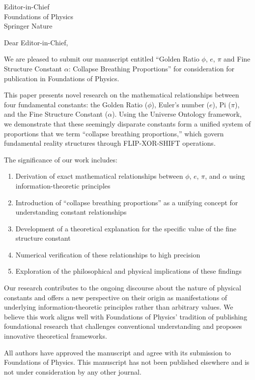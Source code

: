 \documentclass[12pt]{letter}
\begin{document}
\begin{letter}{Editor-in-Chief\\
Foundations of Physics\\
Springer Nature}

\opening{Dear Editor-in-Chief,}

We are pleased to submit our manuscript entitled ``Golden Ratio $\phi$, $e$, $\pi$ and Fine Structure Constant $\alpha$: Collapse Breathing Proportions'' for consideration for publication in Foundations of Physics.

This paper presents novel research on the mathematical relationships between four fundamental constants: the Golden Ratio ($\phi$), Euler's number ($e$), Pi ($\pi$), and the Fine Structure Constant ($\alpha$). Using the Universe Ontology framework, we demonstrate that these seemingly disparate constants form a unified system of proportions that we term ``collapse breathing proportions,'' which govern fundamental reality structures through FLIP-XOR-SHIFT operations.

The significance of our work includes:

\begin{enumerate}
\item Derivation of exact mathematical relationships between $\phi$, $e$, $\pi$, and $\alpha$ using information-theoretic principles
\item Introduction of ``collapse breathing proportions'' as a unifying concept for understanding constant relationships
\item Development of a theoretical explanation for the specific value of the fine structure constant
\item Numerical verification of these relationships to high precision
\item Exploration of the philosophical and physical implications of these findings
\end{enumerate}

Our research contributes to the ongoing discourse about the nature of physical constants and offers a new perspective on their origin as manifestations of underlying information-theoretic principles rather than arbitrary values. We believe this work aligns well with Foundations of Physics' tradition of publishing foundational research that challenges conventional understanding and proposes innovative theoretical frameworks.

All authors have approved the manuscript and agree with its submission to Foundations of Physics. This manuscript has not been published elsewhere and is not under consideration by any other journal.


\end{letter}
\end{document}
